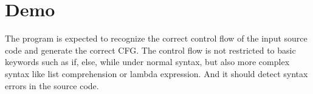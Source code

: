 \documentclass[11pt]{article}
\begin{document}
\section{Demo}\label{section-demo}
The program is expected to recognize the correct control flow of the input source code and generate the correct CFG. The control flow is not restricted to basic keywords such as if, else, while under normal syntax, but also more complex syntax like list comprehension or lambda expression. And it should detect syntax errors in the source code.
\end{document}
